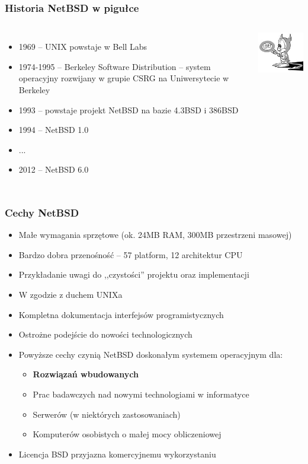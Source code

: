 \documentclass[dvipsnames,table]{beamer}
\begin{document}
\begin{frame}
\frametitle{Historia NetBSD w pigułce}
\begin{columns}[c]
\column{3in}
\begin{itemize}
	\item 1969 -- UNIX powstaje w Bell Labs
	\item 1974-1995 -- Berkeley Software Distribution -- system operacyjny rozwijany w grupie CSRG na Uniwersytecie w Berkeley
	\item 1993 -- powstaje projekt NetBSD na bazie 4.3BSD i 386BSD
	\item 1994 -- NetBSD 1.0
	\item ...
	\item 2012 -- NetBSD 6.0
\end{itemize}
\column{1in}
\includegraphics[scale=0.5]{img_bsddaemon.jpg}
\end{columns}
\end{frame}

\begin{frame}
\frametitle{Cechy NetBSD}
\begin{itemize}
	\item Małe wymagania sprzętowe (ok. 24MB RAM, 300MB przestrzeni masowej)
	\item Bardzo dobra przenośność -- 57 platform, 12 architektur CPU
	\item Przykładanie uwagi do ,,czystości'' projektu oraz implementacji
	\item W zgodzie z duchem UNIXa
	\item Kompletna dokumentacja interfejsów programistycznych
	\item Ostrożne podejście do nowości technologicznych
	\item Powyższe cechy czynią NetBSD doskonałym systemem operacyjnym dla:
	\begin{itemize}
		\item \textbf{Rozwiązań wbudowanych}
		\item Prac badawczych nad nowymi technologiami w informatyce
		\item Serwerów (w niektórych zastosowaniach)
		\item Komputerów osobistych o małej mocy obliczeniowej
	\end{itemize}
	\item Licencja BSD przyjazna komercyjnemu wykorzystaniu
\end{itemize}
\end{frame}
\end{document}
